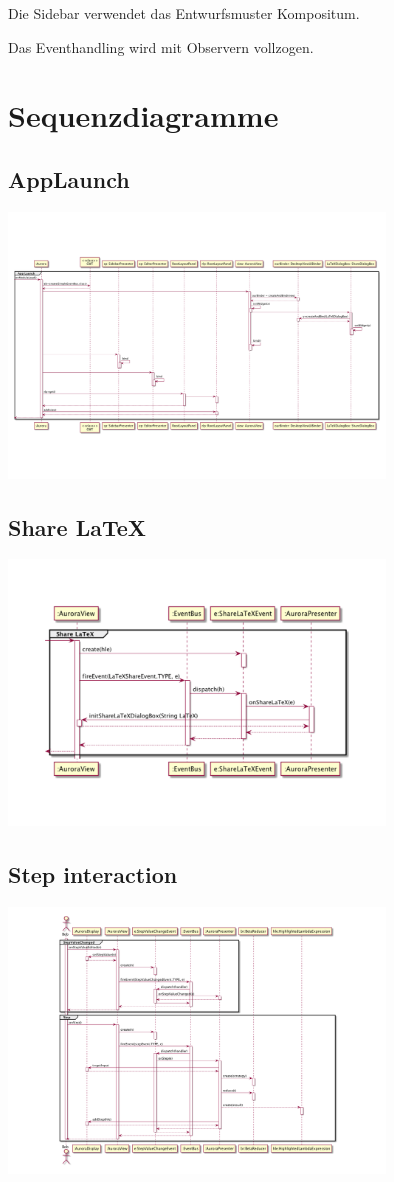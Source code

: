 \documentclass[parskip=full,11pt,twoside]{scrbook}
\begin{document}
Die Sidebar verwendet das Entwurfsmuster Kompositum.

Das Eventhandling wird mit Observern vollzogen.


\newpage
\section{Sequenzdiagramme}
\subsection{AppLaunch}
\includegraphics[width=0.75\textwidth]{../uml/SD/AppLaunch.png}
\subsection{Share LaTeX}
\includegraphics[width=0.75\textwidth]{../uml/SD/ShareLaTeX.png}
\subsection{Step interaction}
\includegraphics[width=0.75\textwidth]{../uml/SD/StepInteraction.png}
\end{document}
